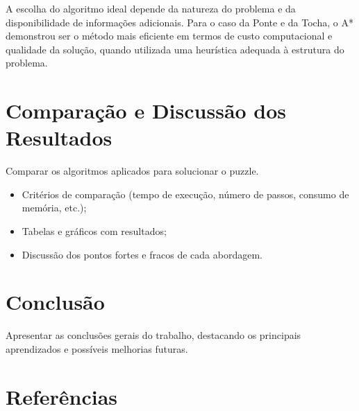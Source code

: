 \documentclass[12pt,a4paper]{article}
\begin{document}
A escolha do algoritmo ideal depende da natureza do problema e da disponibilidade de informações adicionais. 
Para o caso da Ponte e da Tocha, o A* demonstrou ser o método mais eficiente em termos de custo computacional e qualidade da solução, quando utilizada uma heurística adequada à estrutura do problema.

\section{Comparação e Discussão dos Resultados}
Comparar os algoritmos aplicados para solucionar o puzzle.
\begin{itemize}
\item Critérios de comparação (tempo de execução, número de passos, consumo de memória, etc.);
\item Tabelas e gráficos com resultados;
\item Discussão dos pontos fortes e fracos de cada abordagem.
\end{itemize}

\section{Conclusão}
Apresentar as conclusões gerais do trabalho, destacando os principais aprendizados e possíveis melhorias futuras.

\section*{Referências}


\end{document}
